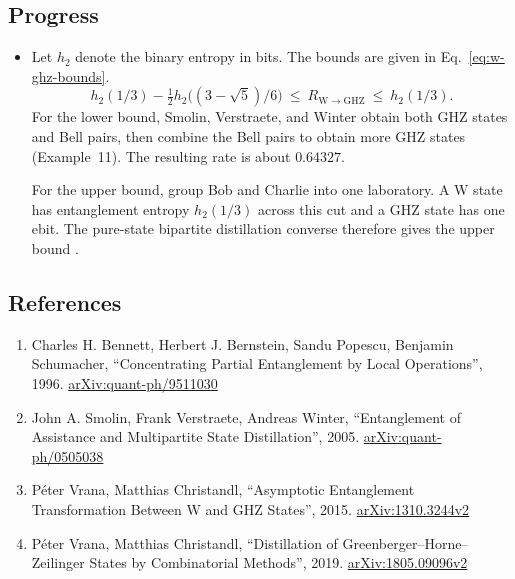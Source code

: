 \subsection*{Progress}

\begin{itemize}
  \item Let $h_2$ denote the binary entropy in bits. The bounds are given in Eq.~\eqref{eq:w-ghz-bounds}.
\begin{equation}
  h_2(1/3)-\tfrac12 h_2\bigl((3-\sqrt{5})/6\bigr)
  \ \leq\ R_{\mathrm{W}\to\mathrm{GHZ}}\ \leq\ h_2(1/3).
  \label{eq:w-ghz-bounds}
\end{equation}
For the lower bound, Smolin, Verstraete, and Winter obtain both GHZ states
and Bell pairs, then combine the Bell pairs to obtain more GHZ states  (Example~11). The resulting rate is about $0.64327$.

For the upper bound, group Bob and Charlie into one laboratory. A W state has
entanglement entropy $h_2(1/3)$ across this cut and a GHZ state has one ebit. The
pure-state bipartite distillation converse therefore gives the upper bound .
\end{itemize}

\subsection*{References}

\begin{enumerate}[label={},leftmargin=4.8em,labelsep=0.5em]
  \footnotesize
  \item[\textup{[BBPS96]}]\label{ref:6e58b1-bbps96}
  Charles H. Bennett, Herbert J. Bernstein, Sandu Popescu, Benjamin Schumacher, “Concentrating Partial Entanglement by Local Operations”, 1996.
\href{https://arxiv.org/abs/quant-ph/9511030}{arXiv:quant-ph/9511030}

  \item[\textup{[SVW05]}]\label{ref:6e58b1-svw05}
  John A. Smolin, Frank Verstraete, Andreas Winter, “Entanglement of Assistance and Multipartite State Distillation”, 2005.
\href{https://arxiv.org/abs/quant-ph/0505038}{arXiv:quant-ph/0505038}

  \item[\textup{[VC15]}]\label{ref:6e58b1-vc15}
  P{\'e}ter Vrana, Matthias Christandl, “Asymptotic Entanglement Transformation Between W and GHZ States”, 2015.
\href{https://arxiv.org/abs/1310.3244v2}{arXiv:1310.3244v2}

  \item[\textup{[VC19]}]\label{ref:6e58b1-vc19}
  P{\'e}ter Vrana, Matthias Christandl, “Distillation of Greenberger--Horne--Zeilinger States by Combinatorial Methods”, 2019.
\href{https://arxiv.org/abs/1805.09096v2}{arXiv:1805.09096v2}
\end{enumerate}

